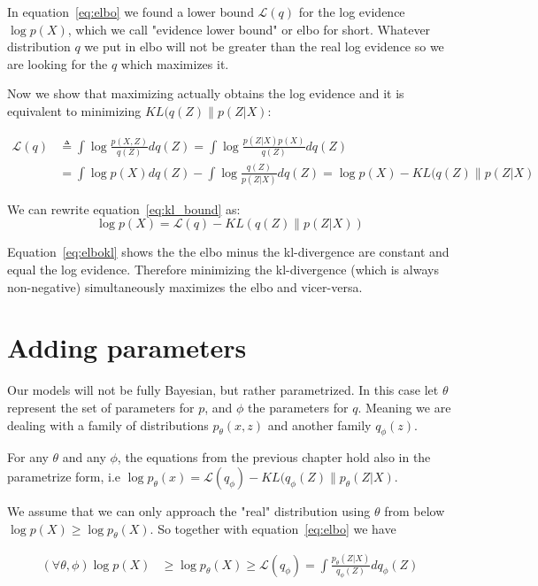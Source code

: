 \documentclass[11pt, a4paper]{report}
\theoremstyle{plain}
\theoremstyle{definition}
\theoremstyle{remark}
\begin{document}
In equation~\ref{eq:elbo} we found a lower bound $\mathcal{L}(q)$ for the log
evidence $\log p(X)$, which we call "evidence lower bound" or elbo for short.
Whatever distribution $q$ we put in elbo will not be
greater than the real log evidence so we are looking for the $q$ which
maximizes it.

Now we show that maximizing actually obtains the log evidence and it is
equivalent to minimizing $KL(q(Z) \| p(Z|X)$:

\begin{equation}\label{eq:kl_bound}
\begin{aligned}
\mathcal{L}(q) &\triangleq \int \log \frac{p(X,Z)}{q(Z)} d q(Z)
= \int \log \frac{p(Z|X)p(X)}{q(Z)} d q(Z) \\
&= \int \log p(X) dq(Z) - \int \log \frac{q(Z)}{p(Z|X)} dq(Z) 
= \log p(X) - KL(q(Z) \| p(Z|X)
\end{aligned}
\end{equation}

We can rewrite equation~\ref{eq:kl_bound} as:
\begin{equation}\label{eq:elbokl}
\log p(X) = \mathcal{L}(q) - KL(q(Z) \| p(Z|X))
\end{equation}

Equation~\ref{eq:elbokl} shows the the elbo minus the kl-divergence are constant
and equal the log evidence. Therefore minimizing the kl-divergence (which is
always non-negative) simultaneously maximizes the elbo and vicer-versa.

\section{Adding parameters}

Our models will not be fully Bayesian, but rather parametrized.
In this case let $\theta$ represent the set of parameters for $p$, and $\phi$
the parameters for $q$. Meaning we are dealing with a family of distributions
$p_{\theta}(x,z)$ and another family $q_{\phi}(z)$.

For any $\theta$ and any $\phi$, the equations from the previous chapter hold
also in the parametrize form, i.e $\log p_{\theta}(x) = \mathcal{L}(q_{\phi}) -
KL(q_{\phi}(Z) \| p_{\theta}(Z|X)$.

We assume that we can only approach the "real" distribution using
$\theta$ from below $\log p(X) \geq \log p_{\theta}(X)$.
So together with equation~\ref{eq:elbo} we have

\begin{equation}\label{eq:parelbo}
\begin{aligned}
(\forall \theta, \phi)\log p(X) & \geq \log p_{\theta}(X) \geq \mathcal{L}(q_{\phi})
= \int \frac{p_{\theta}(Z|X)}{q_{\phi}(Z)} dq_{\phi}(Z)
\end{aligned}
\end{equation}
\end{document}
